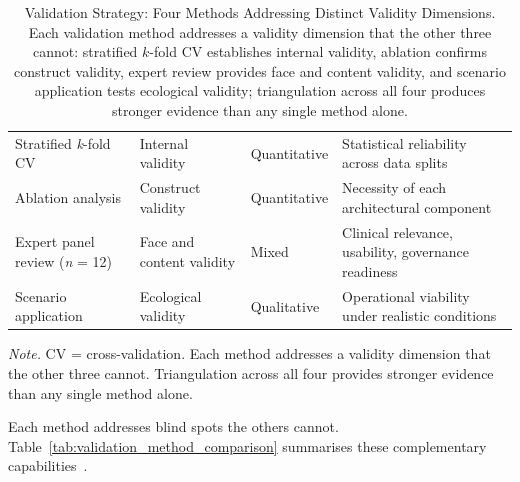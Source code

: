 \begin{table}[!htbp]
\tablestripes\tablefontsize
\tablefontsize
\caption[Validation Strategy]{Validation Strategy: Four Methods Addressing Distinct Validity Dimensions. Each validation method addresses a validity dimension that the other three cannot: stratified $k$-fold CV establishes internal validity, ablation confirms construct validity, expert review provides face and content validity, and scenario application tests ecological validity; triangulation across all four produces stronger evidence than any single method alone.}
\begin{tabularx}{\textwidth}{@{} L >{\raggedright\arraybackslash}p{2.3cm} >{\raggedright\arraybackslash}p{2.2cm} L @{}}
\toprule
{} &  &  &  \\
\midrule
Stratified \textit{k}-fold CV & Internal validity & Quantitative & Statistical reliability across data splits \\
Ablation analysis & Construct validity & Quantitative & Necessity of each architectural component \\
Expert panel review (\textit{n} = 12) & Face and content validity & Mixed & Clinical relevance, usability, governance readiness \\
Scenario application & Ecological validity & Qualitative & Operational viability under realistic conditions \\
\bottomrule
\end{tabularx}
\vspace{0.5em}\noindent\textit{Note.} CV = cross-validation. Each method addresses a validity dimension that the other three cannot. Triangulation across all four provides stronger evidence than any single method alone.
\end{table}

\iffalse
Each method addresses blind spots the others cannot. Table~\ref{tab:validation_method_comparison} summarises these complementary capabilities~\cite{hevner2004design}.

